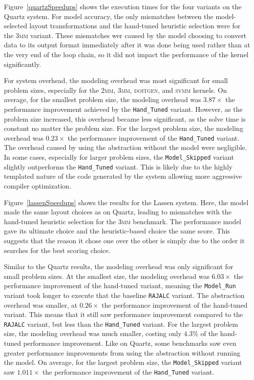 Figure~\ref{quartzSpeedups} shows the execution times for the four variants on the Quartz system. 
For model accuracy, the only mismatches between the model-selected layout transformations and the hand-tuned heuristic selection were for the \textsc{3mm} variant.
These mismatches wer caused by the model choosing to convert data to its output format immediately after it was done being used rather than at the very end of the loop chain, so it did not impact the performance of the kernel significantly.

For system overhead, the modeling overhead was most significant for small problem sizes, especially for the \textsc{2mm}, \textsc{3mm}, \textsc{doitgen}, and \textsc{symm} kernels.
On average, for the smallest problem size, the modeling overhead was $3.87\times$ the performance improvement achieved by the \verb.Hand_Tuned. variant.
However, as the problem size increased, this overhead became less significant, as the solve time is constant no matter the problem size.
For the largest problem size, the modeling overhead was $0.23\times$ the performance improvement of the \verb.Hand_Tuned. variant. 
The overhead caused by using the \FormatDecisions{} abstraction without the model were negligible.
In some cases, especially for larger problem sizes, the \verb.Model_Skipped. variant slightly outperforms the \verb.Hand_Tuned. variant.
This is likely due to the highly templated nature of the code generated by the \FormatDecisions{} system allowing more aggressive compiler optimization.

Figure~\ref{lassenSpeedups} shows the results for the Lassen system.
Here, the model made the same layout choices as on Quartz, leading to mismatches with the hand-tuned heuristic selection for the \textsc{3mm} benchmark. 
The performance model gave its ultimate choice and the heuristic-based choice the same score.
This suggests that the reason it chose one over the other is simply due to the order it searches for the best scoring choice.

Similar to the Quartz results, the modeling overhead was only significant for small problem sizes.
At the smallest size, the modeling overhead was $6.03\times$ the performance improvement of the hand-tuned variant, meaning the \verb.Model_Run. variant took longer to execute that the baseline \verb.RAJALC. variant.
The abstraction overhead was smaller, at $0.26\times$ the performance improvement of the hand-tuned variant.
This means that it still saw performance improvement compared to the \verb.RAJALC. variant, but less than the \verb.Hand_Tuned. variant.
For the largest problem size, the modeling overhead was much smaller, costing only $4.3\%$ of the hand-tuned performance improvement.
Like on Quartz, some benchmarks saw even greater performance improvements from using the \FormatDecisions{} abstraction without running the model.
On average, for the largest problem size, the \verb.Model_Skipped. variant saw $1.011\times$ the performance improvement of the \verb.Hand_Tuned. variant.

